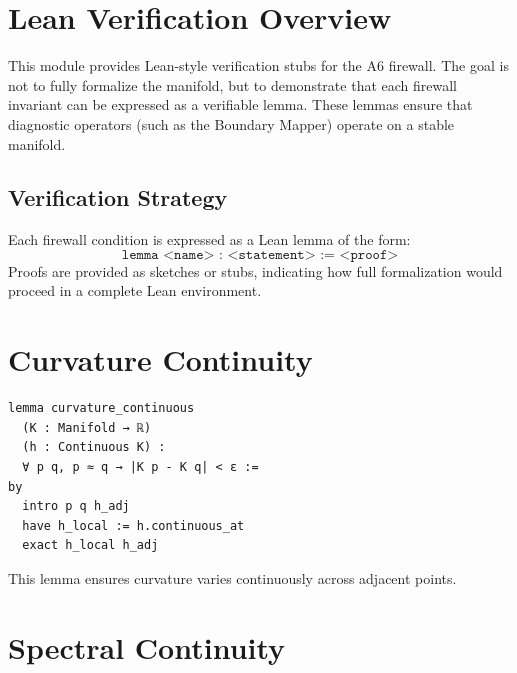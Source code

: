 
\section{Lean Verification Overview}

This module provides Lean-style verification stubs for the A6 firewall. The
goal is not to fully formalize the manifold, but to demonstrate that each
firewall invariant can be expressed as a verifiable lemma. These lemmas
ensure that diagnostic operators (such as the Boundary Mapper) operate on a
stable manifold.

\subsection{Verification Strategy}

Each firewall condition is expressed as a Lean lemma of the form:
\[
\texttt{lemma <name> : <statement> := <proof>}
\]
Proofs are provided as sketches or stubs, indicating how full formalization
would proceed in a complete Lean environment.

\section{Curvature Continuity}

\begin{verbatim}
lemma curvature_continuous
  (K : Manifold → ℝ)
  (h : Continuous K) :
  ∀ p q, p ≈ q → |K p - K q| < ε :=
by
  intro p q h_adj
  have h_local := h.continuous_at
  exact h_local h_adj
\end{verbatim}

This lemma ensures curvature varies continuously across adjacent points.

\section{Spectral Continuity}

